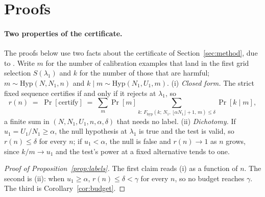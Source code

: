 \documentclass{article} %
\newcommand{\sel}[1]{S(#1)}
\begin{document}



\appendix
\section{Proofs}
\label{app:proofs}
\paragraph{Two properties of the certificate.} The proofs below use two facts about the certificate of Section~\ref{sec:method}, due to \citet{haroon2026certified}. Write $m$ for the number of calibration examples that land in the first grid selection $\sel{\lambda_1}$ and $k$ for the number of those that are harmful; $m \sim \mathrm{Hyp}(N, N_1, n)$ and $k \mid m \sim \mathrm{Hyp}(N_1, U_1, m)$. (i) \emph{Closed form.} The strict fixed sequence certifies if and only if it rejects at $\lambda_1$, so
\[
r(n) \;=\; \Pr[\text{certify}] \;=\; \sum_{m} \Pr[m] \sum_{k :\, F_{\mathrm{hyp}}(k;\, N_1,\, \lfloor \alpha N_1 \rfloor + 1,\, m) \le \delta} \Pr[k \mid m],
\]
a finite sum in $(N, N_1, U_1, n, \alpha, \delta)$ that needs no label. (ii) \emph{Dichotomy.} If $u_1 = U_1 / N_1 \ge \alpha$, the null hypothesis at $\lambda_1$ is true and the test is valid, so $r(n) \le \delta$ for every $n$; if $u_1 < \alpha$, the null is false and $r(n) \to 1$ as $n$ grows, since $k / m \to u_1$ and the test's power at a fixed alternative tends to one.

\begin{proof}[Proof of Proposition~\ref{prop:labels}]
The first claim reads (i) as a function of $n$. The second is (ii): when $u_1 \ge \alpha$, $r(n) \le \delta < \gamma$ for every $n$, so no budget reaches $\gamma$. The third is Corollary~\ref{cor:budget}.
\end{proof}
\end{document}
